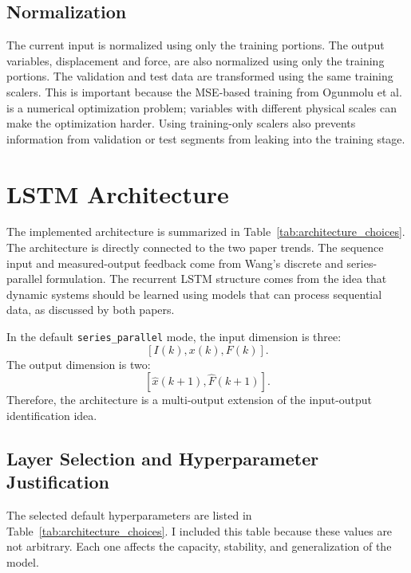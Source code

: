 \documentclass[11pt]{article}
\begin{document}
\subsection{Normalization}
The current input is normalized using only the training portions. The output variables, displacement and force, are also normalized using only the training portions. The validation and test data are transformed using the same training scalers. This is important because the MSE-based training from Ogunmolu et al. is a numerical optimization problem; variables with different physical scales can make the optimization harder. Using training-only scalers also prevents information from validation or test segments from leaking into the training stage.


\section{LSTM Architecture}
The implemented architecture is summarized in Table~\ref{tab:architecture_choices}. The architecture is directly connected to the two paper trends. The sequence input and measured-output feedback come from Wang's discrete and series-parallel formulation. The recurrent LSTM structure comes from the idea that dynamic systems should be learned using models that can process sequential data, as discussed by both papers.

In the default \texttt{series\_parallel} mode, the input dimension is three:
\begin{equation}
\left[I(k),x(k),F(k)\right].
\end{equation}
The output dimension is two:
\begin{equation}
\left[\hat{x}(k+1),\hat{F}(k+1)\right].
\end{equation}
Therefore, the architecture is a multi-output extension of the input-output identification idea.


\subsection{Layer Selection and Hyperparameter Justification}
The selected default hyperparameters are listed in Table~\ref{tab:architecture_choices}. I included this table because these values are not arbitrary. Each one affects the capacity, stability, and generalization of the model.
\end{document}
